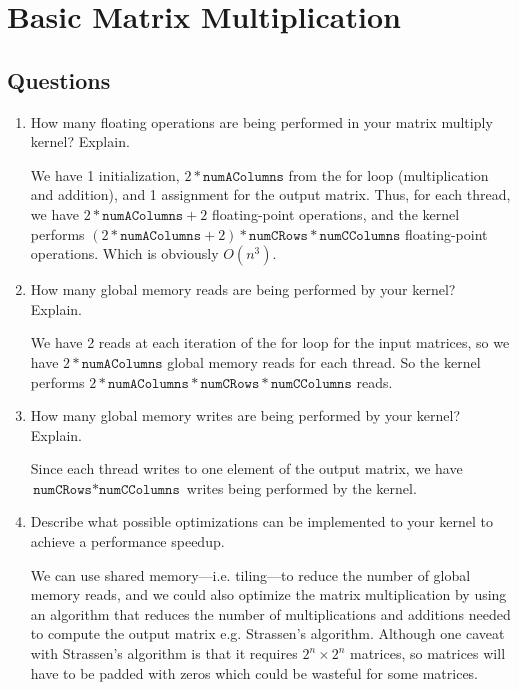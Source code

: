 \documentclass[../main.tex]{subfiles}
\begin{document}
\pagestyle{fancy}


\renewcommand{\thefigure}{\arabic{figure}}
\section*{Basic Matrix Multiplication}

\subsection*{Questions}

\begin{enumerate}
    \item How many floating operations are being performed in your matrix multiply
    kernel? Explain.
    
    We have 1 initialization, $2 * \texttt{numAColumns}$ from the for loop
    (multiplication and addition), and 1 assignment for the output matrix.
    Thus, for each thread, we have $2 * \texttt{numAColumns} + 2$ floating-point operations,
    and the kernel performs
    $(2 * \texttt{numAColumns} + 2) * \texttt{numCRows} * \texttt{numCColumns}$
    floating-point operations. Which is obviously $O(n^3)$.

    \item How many global memory reads are being performed by your kernel?
    Explain.

    We have 2 reads at each iteration of the for loop for the input matrices, so
    we have $2 * \texttt{numAColumns}$ global memory reads for each thread. So
    the kernel performs $2 * \texttt{numAColumns} * \texttt{numCRows} * \texttt{numCColumns}$ reads.

    \item How many global memory writes are being performed by your kernel?
    Explain.

    Since each thread writes to one element of the output matrix, we have
    $\texttt{numCRows} * \texttt{numCColumns}$ writes being performed by the kernel.

    \item Describe what possible optimizations can be implemented to your kernel
    to achieve a performance speedup.

    We can use shared memory---i.e. tiling---to reduce the number of global memory reads, and
    we could also optimize the matrix multiplication by using an algorithm that reduces the number
    of multiplications and additions needed to compute the output matrix e.g. Strassen's algorithm.
    Although one caveat with Strassen's algorithm is that it requires $2^n \times 2^n$ matrices, so
    matrices will have to be padded with zeros which could be wasteful for some matrices.


\end{enumerate}
\end{document}

